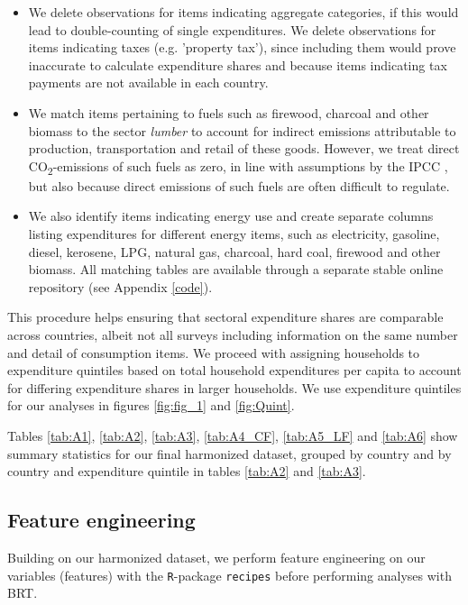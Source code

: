 \documentclass[12pt, a4paper]{article}
\begin{document}
\begin{refsection}
\begin{itemize}
    \item We delete observations for items indicating aggregate categories, if this would lead to double-counting of single expenditures. We delete observations for items indicating taxes (e.g. 'property tax'), since including them would prove inaccurate to calculate expenditure shares and because items indicating tax payments are not available in each country.
    \item We match items pertaining to fuels such as firewood, charcoal and other biomass to the sector \textit{lumber} to account for indirect emissions attributable to production, transportation and retail of these goods. However, we treat direct CO\textsubscript{2}-emissions of such fuels as zero, in line with assumptions by the IPCC \autocite{Grad.2023}, but also because direct emissions of such fuels are often difficult to regulate.
    \item We also identify items indicating energy use and create separate columns listing expenditures for different energy items, such as electricity, gasoline, diesel, kerosene, LPG, natural gas, charcoal, hard coal, firewood and other biomass. All matching tables are available through a separate stable online repository (see Appendix \ref{code}).
\end{itemize}

This procedure helps ensuring that sectoral expenditure shares are comparable across countries, albeit not all surveys including information on the same number and detail of consumption items. We proceed with assigning households to expenditure quintiles based on total household expenditures per capita to account for differing expenditure shares in larger households. We use expenditure quintiles for our analyses in figures \ref{fig:fig_1} and \ref{fig:Quint}.

Tables \ref{tab:A1}, \ref{tab:A2}, \ref{tab:A3}, \ref{tab:A4_CF}, \ref{tab:A5_LF} and \ref{tab:A6} show summary statistics for our final harmonized dataset, grouped by country and by country and expenditure quintile in tables \ref{tab:A2} and \ref{tab:A3}. 


\subsection{Feature engineering} \label{sec:featureengineering}

Building on our harmonized dataset, we perform feature engineering on our variables (features) with the \texttt{R}-package \texttt{recipes} before performing analyses with BRT.


\end{refsection}
\end{document}
